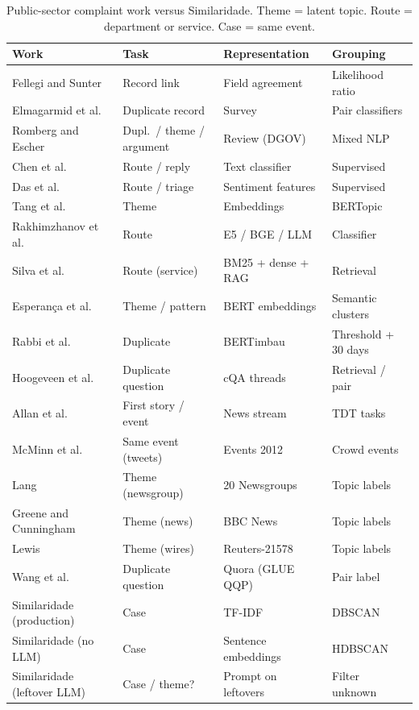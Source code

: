\documentclass[acmlarge,screen]{acmart}
\begin{document}
\begin{table}[t]
\caption{Public-sector complaint work versus Similaridade. Theme = latent topic. Route = department or service. Case = same event.}
\label{tab:sota}
\small
\begin{tabular}{p{3.4cm}p{2.4cm}p{3.1cm}p{3.0cm}}
\toprule
Work & Task & Representation & Grouping \\
\midrule
Fellegi and Sunter~\cite{fellegi1969linkage} & Record link & Field agreement & Likelihood ratio \\
Elmagarmid et al.~\cite{elmagarmid2007duplicate} & Duplicate record & Survey & Pair classifiers \\
Romberg and Escher~\cite{romberg2023citizens} & Dupl.\ / theme / argument & Review (DGOV) & Mixed NLP \\
Chen et al.~\cite{chen2022igcp} & Route / reply & Text classifier & Supervised \\
Das et al.~\cite{das2020grievance} & Route / triage & Sentiment features & Supervised \\
Tang et al.~\cite{tang2024bertopic} & Theme & Embeddings & BERTopic \\
Rakhimzhanov et al.~\cite{rakhimzhanov2025transport} & Route & E5 / BGE / LLM & Classifier \\
Silva et al.~\cite{silva2026bridging} & Route (service) & BM25 + dense + RAG & Retrieval \\
Esperan\c{c}a et al.~\cite{esperanca2025complaint} & Theme / pattern & BERT embeddings & Semantic clusters \\
Rabbi et al.~\cite{rabbi2026duplicate} & Duplicate & BERTimbau & Threshold + 30 days \\
Hoogeveen et al.~\cite{hoogeveen2015cqadupstack} & Duplicate question & cQA threads & Retrieval / pair \\
Allan et al.~\cite{allan1998tdt} & First story / event & News stream & TDT tasks \\
McMinn et al.~\cite{mcminn2013events} & Same event (tweets) & Events 2012 & Crowd events \\
Lang~\cite{lang1995newsweeder} & Theme (newsgroup) & 20 Newsgroups & Topic labels \\
Greene and Cunningham~\cite{greene2006bbc} & Theme (news) & BBC News & Topic labels \\
Lewis~\cite{lewis1997reuters} & Theme (wires) & Reuters-21578 & Topic labels \\
Wang et al.~\cite{wang2018glue} & Duplicate question & Quora (GLUE QQP) & Pair label \\
Similaridade (production) & Case & TF-IDF & DBSCAN \\
Similaridade (no LLM) & Case & Sentence embeddings & HDBSCAN \\
Similaridade (leftover LLM) & Case / theme? & Prompt on leftovers & Filter unknown \\
\bottomrule
\end{tabular}
\end{table}
\end{document}
